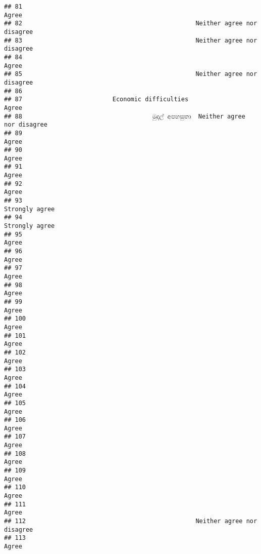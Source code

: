 \documentclass[
]{article}
\begin{document}
\begin{verbatim}
## 81                                                                     Agree
## 82                                                Neither agree nor disagree
## 83                                                Neither agree nor disagree
## 84                                                                     Agree
## 85                                                Neither agree nor disagree
## 86                                                                          
## 87                         Economic difficulties                       Agree
## 88                                    මුදල් අපහසුතා  Neither agree nor disagree
## 89                                                                     Agree
## 90                                                                     Agree
## 91                                                                     Agree
## 92                                                                     Agree
## 93                                                            Strongly agree
## 94                                                            Strongly agree
## 95                                                                     Agree
## 96                                                                     Agree
## 97                                                                     Agree
## 98                                                                     Agree
## 99                                                                     Agree
## 100                                                                    Agree
## 101                                                                    Agree
## 102                                                                    Agree
## 103                                                                    Agree
## 104                                                                    Agree
## 105                                                                    Agree
## 106                                                                    Agree
## 107                                                                    Agree
## 108                                                                    Agree
## 109                                                                    Agree
## 110                                                                    Agree
## 111                                                                    Agree
## 112                                               Neither agree nor disagree
## 113                                                                    Agree

\end{verbatim}
\end{document}
